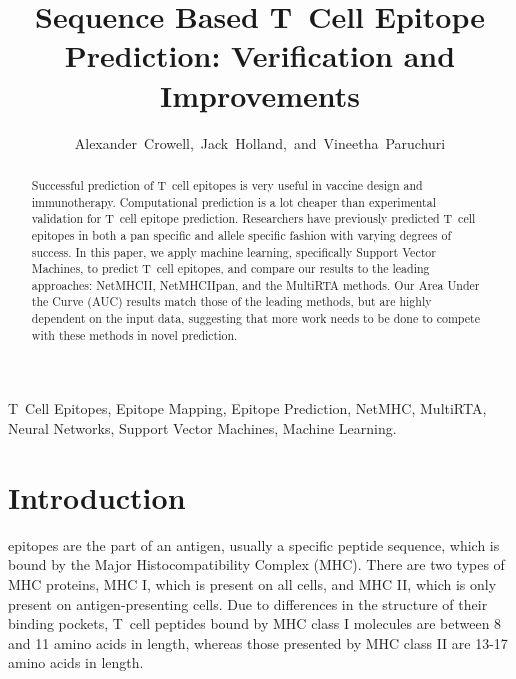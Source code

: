 \documentclass[journal]{IEEEtran}
\begin{document}
\title{Sequence Based T~Cell Epitope Prediction: Verification and Improvements}

\author{Alexander~Crowell,~Jack~Holland,~and~Vineetha~Paruchuri}


\maketitle


\begin{abstract}
Successful prediction of T~cell epitopes is very useful in vaccine design and immunotherapy. Computational prediction is a lot cheaper than experimental validation for T~cell epitope prediction. Researchers have previously predicted T~cell epitopes in both a pan specific and allele specific fashion with varying degrees of success. In this paper, we apply machine learning, specifically Support Vector Machines, to predict T~cell epitopes, and compare our results to the leading approaches: NetMHCII, NetMHCIIpan, and the MultiRTA methods. Our Area Under the Curve (AUC) results match those of the leading methods, but are highly dependent on the input data, suggesting that more work needs to be done to compete with these methods in novel prediction.
\end{abstract}


\begin{IEEEkeywords}
T~Cell Epitopes, Epitope Mapping, Epitope Prediction, NetMHC, MultiRTA, Neural Networks, Support Vector Machines, Machine Learning.
\end{IEEEkeywords}





\section{Introduction}

 epitopes are the part of an antigen, usually a specific peptide sequence, which is bound by the Major Histocompatibility Complex (MHC). There are two types of MHC proteins, MHC I, which is present on all cells, and MHC II, which is only present on antigen-presenting cells. Due to differences in the structure of their binding pockets, T~cell peptides bound by MHC class I molecules are between 8 and 11 amino acids in length, whereas those presented by MHC class II are 13-17 amino acids in length. 
\end{document}
